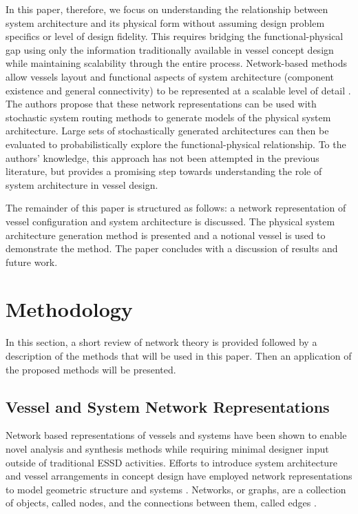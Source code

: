 \documentclass[preprint,12pt]{elsarticle}
\begin{document}
In this paper, therefore, we focus on understanding the relationship between system architecture and its physical form without assuming design problem specifics or level of design fidelity. This requires bridging the functional-physical gap using only the information traditionally available in vessel concept design while maintaining scalability through the entire process. Network-based methods allow vessels layout and functional aspects of system architecture (component existence and general connectivity) to be represented at a scalable level of detail \citep{VanOers2011,Gillespie2012,Rigterink2014,Dellsy2015}. The authors propose that these network representations can be used with stochastic system routing methods to generate models of the physical system architecture. Large sets of stochastically generated architectures can then be evaluated to probabilistically explore the functional-physical relationship. To the authors' knowledge, this approach has not been attempted in the previous literature, but provides a promising step towards understanding the role of system architecture in vessel design.


The remainder of this paper is structured as follows: a network representation of vessel configuration and system architecture is discussed. The physical system architecture generation method is presented and a notional vessel is used to demonstrate the method. The paper concludes with a discussion of results and future work. 

\section{Methodology}
In this section, a short review of network theory is provided followed by a description of the methods that will be used in this paper. Then an application of the proposed methods will be presented.

\subsection{Vessel and System Network Representations} 
Network based representations of vessels and systems have been shown to enable novel analysis and synthesis methods while requiring minimal designer input outside of traditional ESSD activities. Efforts to introduce system architecture and vessel arrangements in concept design have employed network representations to model geometric structure \citep{Gillespie2012,VanOers2011,VanOers2012} and systems \citep{Rigterink2014,Shields2015,Dellsy2015}. Networks, or graphs, are a collection of objects, called nodes, and the connections between them, called edges \citep{Newman2003}. 
\end{document}
